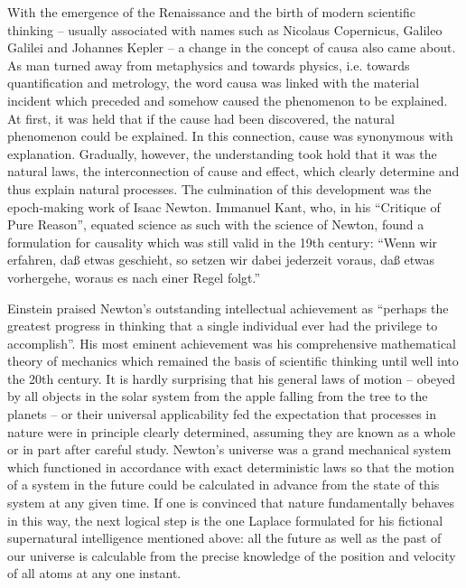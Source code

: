 \documentclass[12pt]{article}
\begin{document}
\hfill

With the emergence of the Renaissance and the birth of modern scientific thinking
– usually associated with names such as Nicolaus Copernicus, Galileo Galilei
and Johannes Kepler – a change in the concept of causa also came about. As man
turned away from metaphysics and towards physics, i.e. towards quantification and
metrology, the word causa was linked with the material incident which preceded
and somehow caused the phenomenon to be explained. At first, it was held that if
the cause had been discovered, the natural phenomenon could be explained. In this
connection, cause was synonymous with explanation. Gradually, however, the understanding
took hold that it was the natural laws, the interconnection of cause and
effect, which clearly determine and thus explain natural processes. The culmination
of this development was the epoch-making work of Isaac Newton. Immanuel Kant,
who, in his “Critique of Pure Reason”, equated science as such with the science of
Newton, found a formulation for causality which was still valid in the 19th century:
“Wenn wir erfahren, daß etwas geschieht, so setzen wir dabei jederzeit voraus, daß
etwas vorhergehe, woraus es nach einer Regel folgt.”

\hfill

Einstein praised Newton’s outstanding intellectual achievement as “perhaps the
greatest progress in thinking that a single individual ever had the privilege to
accomplish”. His most eminent achievement was his comprehensive mathematical
theory of mechanics which remained the basis of scientific thinking until well into
the 20th century. It is hardly surprising that his general laws of motion – obeyed by
all objects in the solar system from the apple falling from the tree to the planets –
or their universal applicability fed the expectation that processes in nature were in
principle clearly determined, assuming they are known as a whole or in part after
careful study. Newton’s universe was a grand mechanical system which functioned
in accordance with exact deterministic laws so that the motion of a system in the
future could be calculated in advance from the state of this system at any given
time. If one is convinced that nature fundamentally behaves in this way, the next
logical step is the one Laplace formulated for his fictional supernatural intelligence
mentioned above: all the future as well as the past of our universe is calculable from
the precise knowledge of the position and velocity of all atoms at any one instant.
\end{document}
